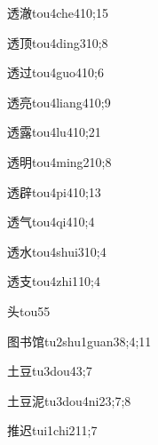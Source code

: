\begin{verbete}{透澈}{tou4che4}{10;15}
\end{verbete}
\begin{verbete}{透顶}{tou4ding3}{10;8}
\end{verbete}
\begin{verbete}{透过}{tou4guo4}{10;6}
\end{verbete}
\begin{verbete}{透亮}{tou4liang4}{10;9}
\end{verbete}
\begin{verbete}{透露}{tou4lu4}{10;21}
\end{verbete}
\begin{verbete}{透明}{tou4ming2}{10;8}
\end{verbete}
\begin{verbete}{透辟}{tou4pi4}{10;13}
\end{verbete}
\begin{verbete}{透气}{tou4qi4}{10;4}
\end{verbete}
\begin{verbete}{透水}{tou4shui3}{10;4}
\end{verbete}
\begin{verbete}{透支}{tou4zhi1}{10;4}
\end{verbete}
\begin{verbete}{头}{tou5}{5}
\end{verbete}
\begin{verbete}{图书馆}{tu2shu1guan3}{8;4;11}
\end{verbete}
\begin{verbete}{土豆}{tu3dou4}{3;7}
\end{verbete}
\begin{verbete}{土豆泥}{tu3dou4ni2}{3;7;8}
\end{verbete}
\begin{verbete}{推迟}{tui1chi2}{11;7}
\end{verbete}
